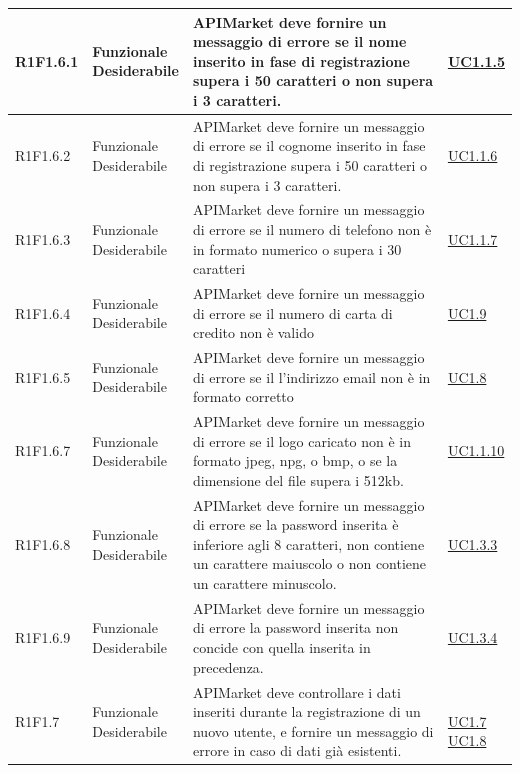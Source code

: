 \documentclass[12pt,a4paper,titlepage]{article}
\newcommand{\minitab}[2][1]{\begin{tabular}#1 #2\end{tabular}}
\newcommand{\uc}[1]{\hyperref[UC#1]{UC#1}}
\begin{document}
{\begin{longtable}{|m{5em}|m{6em}|m{28em}|m{5em}|}
			\hline
			R1F1.6.1 & \minitab[c]{Funzionale\\Desiderabile} & APIMarket deve fornire un messaggio di errore se il nome inserito in fase di registrazione supera i 50 caratteri o non supera i 3 caratteri. & \uc{1.1.5}\\
			\hline
			R1F1.6.2 & \minitab[c]{Funzionale\\Desiderabile} & APIMarket deve fornire un messaggio di errore se il cognome inserito in fase di registrazione supera i 50 caratteri o non supera i 3 caratteri. & \uc{1.1.6}\\
			\hline
			R1F1.6.3 & \minitab[c]{Funzionale\\Desiderabile} & APIMarket deve fornire un messaggio di errore se il numero di telefono non è in formato numerico o supera i 30 caratteri & \uc{1.1.7}\\
			\hline
			R1F1.6.4 & \minitab[c]{Funzionale\\Desiderabile} & APIMarket deve fornire un messaggio di errore se il numero di carta di credito non è valido & \uc{1.9}\\
			\hline
			R1F1.6.5 & \minitab[c]{Funzionale\\Desiderabile} & APIMarket deve fornire un messaggio di errore se il l'indirizzo email non è in formato corretto & \uc{1.8}\\
			\hline
			R1F1.6.7 & \minitab[c]{Funzionale\\Desiderabile} & APIMarket deve fornire un messaggio di errore se il logo caricato non è in formato jpeg, npg, o bmp, o se la dimensione del file supera i 512kb. & \uc{1.1.10}\\
			\hline
			R1F1.6.8 & \minitab[c]{Funzionale\\Desiderabile} & APIMarket deve fornire un messaggio di errore se la password inserita è inferiore agli 8 caratteri, non contiene un carattere maiuscolo o non contiene un carattere minuscolo. & \uc{1.3.3}\\
			\hline
			R1F1.6.9 & \minitab[c]{Funzionale\\Desiderabile} & APIMarket deve fornire un messaggio di errore la password inserita non concide con quella inserita in precedenza. & \uc{1.3.4}\\
			\hline
			R1F1.7 & \minitab[c]{Funzionale\\Desiderabile} & APIMarket deve controllare i dati inseriti durante la registrazione di un nuovo utente, e fornire un messaggio di errore in caso di dati già esistenti. & \shortstack[l]{\\\uc{1.7}\\\uc{1.8}}\\

\end{longtable}}
\end{document}

